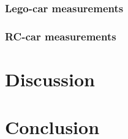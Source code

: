 \documentclass[11pt,a4paper]{article}
\begin{document}
  \subsubsection{Lego-car measurements}
    \begin{figure}[H]%
      \centering
      \caption{}%
      \label{fig:vel_fit}%
    \end{figure}

  \subsubsection{RC-car measurements}


\section{\label{sec:disc}Discussion}
\section{\label{sec:conc}Conclusion}
\end{document}
